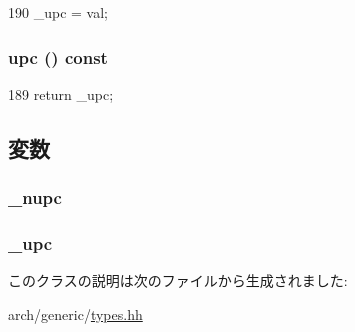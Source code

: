 \begin{DoxyCode}
190 { _upc = val; }
\end{DoxyCode}
\hypertarget{classGenericISA_1_1UPCState_a58857cf73ead03fe3a2e9ca79587f326}{
\subsubsection[{upc}]{ upc () const}}
\label{classGenericISA_1_1UPCState_a58857cf73ead03fe3a2e9ca79587f326}



\begin{DoxyCode}
189 { return _upc; }
\end{DoxyCode}


\subsection{変数}
\hypertarget{classGenericISA_1_1UPCState_ac04fdfa88334f532e3358ae2d9cff2cd}{
\subsubsection[{\_\-nupc}]{ {\bf \_\-nupc}}}
\label{classGenericISA_1_1UPCState_ac04fdfa88334f532e3358ae2d9cff2cd}
\hypertarget{classGenericISA_1_1UPCState_ada1172c4155a1a9d7c37c92ca5326ba7}{
\subsubsection[{\_\-upc}]{ {\bf \_\-upc}}}
\label{classGenericISA_1_1UPCState_ada1172c4155a1a9d7c37c92ca5326ba7}


このクラスの説明は次のファイルから生成されました:\begin{DoxyCompactItemize}
\item 
arch/generic/\hyperlink{arch_2generic_2types_8hh}{types.hh}\end{DoxyCompactItemize}
